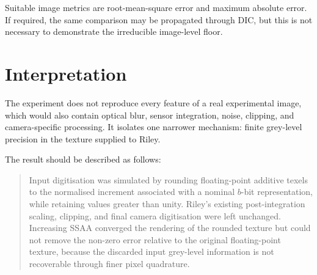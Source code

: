 \documentclass[11pt,a4paper]{article}
\begin{document}
Suitable image metrics are root-mean-square error and maximum absolute error. If required, the same comparison may be propagated through DIC, but this is not necessary to demonstrate the irreducible image-level floor.

\section{Interpretation}

The experiment does not reproduce every feature of a real experimental image, which would also contain optical blur, sensor integration, noise, clipping, and camera-specific processing. It isolates one narrower mechanism: finite grey-level precision in the texture supplied to Riley.

The result should be described as follows:

\begin{quote}
Input digitisation was simulated by rounding floating-point additive texels to the normalised increment associated with a nominal $b$-bit representation, while retaining values greater than unity. Riley's existing post-integration scaling, clipping, and final camera digitisation were left unchanged. Increasing SSAA converged the rendering of the rounded texture but could not remove the non-zero error relative to the original floating-point texture, because the discarded input grey-level information is not recoverable through finer pixel quadrature.
\end{quote}
\end{document}

